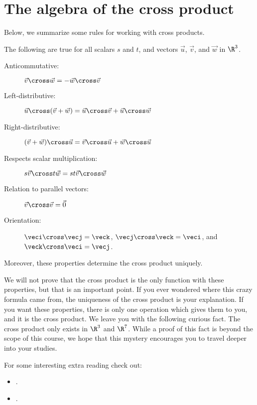 \documentclass{ximera}
\begin{document}
\section{The algebra of the cross product}


Below, we summarize some rules for working with cross products.

\begin{theorem}
  The following are true for all scalars $s$ and $t$, and vectors
  $\vec{u}$, $\vec{v}$, and $\vec{w}$ in $\R^3$.
  \begin{description}
  \item[Anticommutative:] $\vec{v} \cross \vec{w}  = -\vec{w} \cross \vec{v}$
  \item[Left-distributive:] $\vec{u} \cross (\vec{v} +\vec{w}) = \vec{u} \cross \vec{v}+\vec{u}\cross\vec{w}$
  \item[Right-distributive:] $(\vec{v}+\vec{w}) \cross \vec{u} = \vec{v} \cross \vec{u}+\vec{w} \cross \vec{u}$
  \item[Respects scalar multiplication:] $s\vec{v} \cross t\vec{w} = st \vec{v} \cross \vec{w}$
  \item[Relation to parallel vectors:] $\vec{v} \cross \vec{v} = \vec{0}$
  \item[Orientation:] $\veci \cross \vecj = \veck$, $\vecj \cross \veck = \veci$, and $\veck \cross \veci = \vecj$.
  \end{description}
  Moreover, these properties determine the cross product uniquely.
\end{theorem}

We will not prove that the cross product is the only function with
these properties, but that is an important point.  If you ever
wondered where this crazy formula came from, the uniqueness of the cross product is your explanation.  If you
want these properties, there is only one operation which gives them to you, and
it is the cross product. We leave you with the following curious fact.
The cross product only exists in $\R^3$ and $\R^7$. While a proof of this fact is
beyond the scope of this course, we hope that this mystery encourages
you to travel deeper into your studies.


For some interesting extra reading check out:
\begin{itemize}
\item {}.
\item {}.
\end{itemize}
\end{document}
